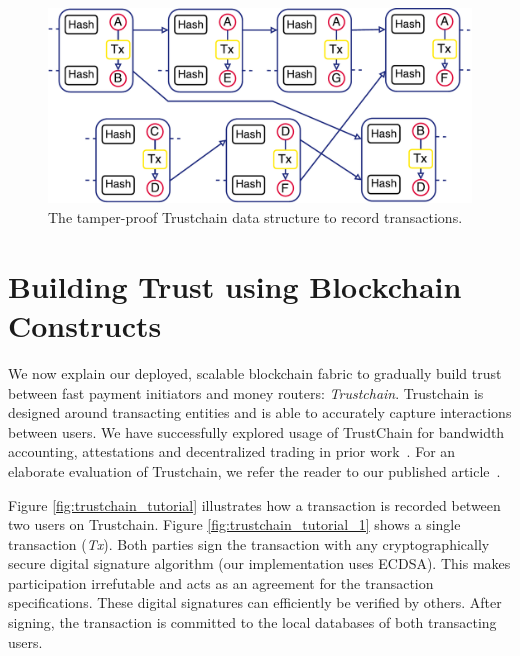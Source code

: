 \begin{figure}[t]
	\centering
	\includegraphics[width=.8\linewidth]{iom/assets/trustchain}
	\caption{The tamper-proof Trustchain data structure to record transactions.}
	\label{fig:trustchain}
\end{figure}

\section{Building Trust using Blockchain Constructs}
\label{sec:trust}
We now explain our deployed, scalable blockchain fabric to gradually build trust between fast payment initiators and money routers: \emph{Trustchain}.
Trustchain is designed around transacting entities and is able to accurately capture interactions between users.
We have successfully explored usage of TrustChain for bandwidth accounting, attestations and decentralized trading in prior work~\cite{pouwelse2017laws}. %
For an elaborate evaluation of Trustchain, we refer the reader to our published article~\cite{otte2017trustchain}.

Figure \ref{fig:trustchain_tutorial} illustrates how a transaction is recorded between two users on Trustchain.
Figure \ref{fig:trustchain_tutorial_1} shows a single transaction (\emph{Tx}).
Both parties sign the transaction with any cryptographically secure digital signature algorithm (our implementation uses ECDSA).
This makes participation irrefutable and acts as an agreement for the transaction specifications.
These digital signatures can efficiently be verified by others.
After signing, the transaction is committed to the local databases of both transacting users.

